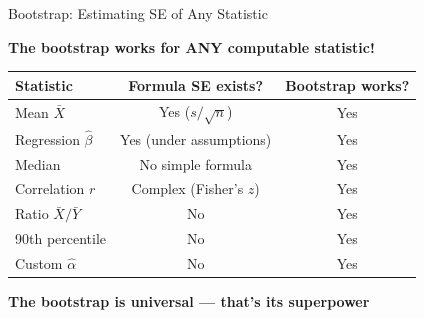\documentclass[aspectratio=169, 11pt]{beamer}
\begin{document}
\begin{frame}{Bootstrap: Estimating SE of Any Statistic}

\textbf{The bootstrap works for ANY computable statistic!}

\vspace{0.5em}
\begin{center}
\begin{tabular}{lcc}
\toprule
Statistic & Formula SE exists? & Bootstrap works? \\
\midrule
Mean $\bar{X}$ & \textcolor{softgreen}{Yes} ($s/\sqrt{n}$) & \textcolor{softgreen}{Yes} \\
Regression $\hat{\beta}$ & \textcolor{softgreen}{Yes} (under assumptions) & \textcolor{softgreen}{Yes} \\
Median & \textcolor{softred}{No simple formula} & \textcolor{softgreen}{Yes} \\
Correlation $r$ & Complex (Fisher's $z$) & \textcolor{softgreen}{Yes} \\
Ratio $\bar{X}/\bar{Y}$ & \textcolor{softred}{No} & \textcolor{softgreen}{Yes} \\
90th percentile & \textcolor{softred}{No} & \textcolor{softgreen}{Yes} \\
Custom $\hat{\alpha}$ & \textcolor{softred}{No} & \textcolor{softgreen}{Yes} \\
\bottomrule
\end{tabular}
\end{center}

\vspace{0.3em}
\centering
\textcolor{accent}{\textbf{The bootstrap is universal --- that's its superpower}}
\end{frame}
\end{document}
